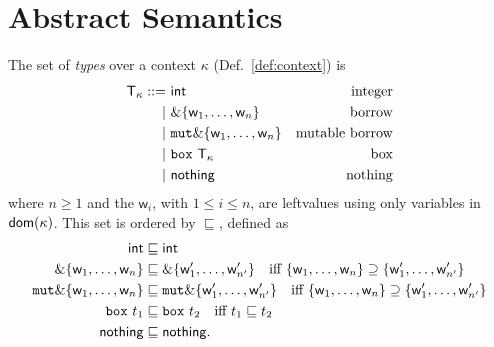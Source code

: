 \section{Abstract Semantics}\label{sec:abstract_semantics}

\begin{definition}[Types]
  The set of \emph{types} over a context $\kappa$ (Def.~\ref{def:context}) is
  \begin{align*}
    \mathsf{T}_\kappa ::=&\ \mathsf{int} & \text{integer}\\
    | &\ \&\{\mathsf{w}_1,\ldots,\mathsf{w}_n\} & \text{borrow}\\
    | &\ \mathtt{mut}\&\{\mathsf{w}_1,\ldots,\mathsf{w}_n\} & \text{mutable borrow}\\
    | &\ \mathtt{box}\ \mathsf{T}_\kappa & \text{box}\\
    | &\ \mathsf{nothing} & \text{nothing}
  \end{align*}
  where $n\ge 1$ and the $\mathsf{w}_i$, with $1\le i\le n$, are leftvalues
  using only variables in $\mathsf{dom}(\kappa)$. This set is ordered by $\sqsubseteq$, defined as
  \begin{align*}
    \mathsf{int}&\sqsubseteq\mathsf{int}\\
    \&\{\mathsf{w}_1,\ldots,\mathsf{w}_n\} & \sqsubseteq
    \&\{\mathsf{w}'_1,\ldots,\mathsf{w}'_{n'}\} \quad\text{iff $\{\mathsf{w}_1,\ldots,\mathsf{w}_n\}\supseteq\{\mathsf{w}'_1,\ldots,\mathsf{w}'_{n'}\}$}\\
    \mathtt{mut}\&\{\mathsf{w}_1,\ldots,\mathsf{w}_n\} & \sqsubseteq
    \mathtt{mut}\&\{\mathsf{w}'_1,\ldots,\mathsf{w}'_{n'}\} \quad\text{iff $\{\mathsf{w}_1,\ldots,\mathsf{w}_n\}\supseteq\{\mathsf{w}'_1,\ldots,\mathsf{w}'_{n'}\}$}\\
    \mathtt{box}\ t_1&\sqsubseteq\mathtt{box}\ t_2 \quad\text{iff $t_1\sqsubseteq t_2$}\\
    \mathsf{nothing}&\sqsubseteq\mathsf{nothing}.
  \end{align*}
\end{definition}

